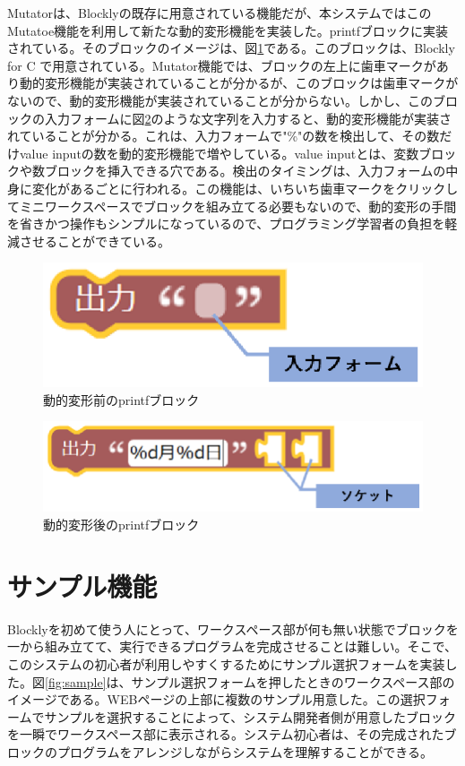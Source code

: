 \documentclass{risepaper}
\begin{document}
Mutatorは、Blocklyの既存に用意されている機能だが、本システムではこのMutatoe機能を利用して新たな動的変形機能を実装した。printfブロックに実装されている。そのブロックのイメージは、図\ref{fig:output}である。このブロックは、Blockly for C で用意されている。Mutator機能では、ブロックの左上に歯車マークがあり動的変形機能が実装されていることが分かるが、このブロックは歯車マークがないので、動的変形機能が実装されていることが分からない。しかし、このブロックの入力フォームに図\ref{fig:output2}のような文字列を入力すると、動的変形機能が実装されていることが分かる。これは、入力フォームで"\%"の数を検出して、その数だけvalue inputの数を動的変形機能で増やしている。value inputとは、変数ブロックや数ブロックを挿入できる穴である。検出のタイミングは、入力フォームの中身に変化があるごとに行われる。この機能は、いちいち歯車マークをクリックしてミニワークスペースでブロックを組み立てる必要もないので、動的変形の手間を省きかつ操作もシンプルになっているので、プログラミング学習者の負担を軽減させることができている。

\begin{figure}[h]
\begin{center}
\includegraphics[scale=0.5]{img/output.eps}
\caption{動的変形前のprintfブロック}%
\label{fig:output}
\end{center}%
\end{figure}%

\begin{figure}[h]
\begin{center}
\includegraphics[scale=0.5]{img/output2.eps}
\caption{動的変形後のprintfブロック}%
\label{fig:output2}
\end{center}%
\end{figure}%

   \section{サンプル機能}
Blocklyを初めて使う人にとって、ワークスペース部が何も無い状態でブロックを一から組み立てて、実行できるプログラムを完成させることは難しい。そこで、このシステムの初心者が利用しやすくするためにサンプル選択フォームを実装した。図\ref{fig:sample}は、サンプル選択フォームを押したときのワークスペース部のイメージである。WEBページの上部に複数のサンプル用意した。この選択フォームでサンプルを選択することによって、システム開発者側が用意したブロックを一瞬でワークスペース部に表示される。システム初心者は、その完成されたブロックのプログラムをアレンジしながらシステムを理解することができる。
\end{document}
